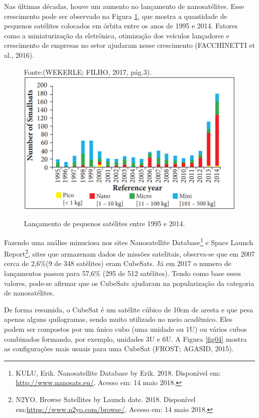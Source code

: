 Nas últimas décadas, houve um aumento no lançamento de nanosatélites. Esse crescimento pode ser observado na Figura \ref{fig03}, que mostra a quantidade de pequenos satélites colocados em órbita entre os anos de 1995 e 2014. Fatores como a miniaturização da eletrônica, otimização dos veículos lançadores e crescimento de empresas no setor ajudaram nesse crescimento (FACCHINETTI et al., 2016).

\begin{figure}[h]
	\centering
    Fonte:(WEKERLE; FILHO, 2017, pág.3).
	\includegraphics[keepaspectratio=true,scale=0.55]{figuras/lancamentoPequenoSatellite.PNG}
	\caption{Lançamento de pequenos satélites entre 1995 e 2014.}
	\label{fig03}
\end{figure}

Fazendo uma análise minuciosa nos sites Nanosatellite Database\footnote{ KULU, Erik. Nanosatellite Database by Erik. 2018. Disponível em: \url{http://www.nanosats.eu/}. Acesso em: 14 maio 2018.} e Space Launch Report\footnote{N2YO. Browse Satellites by Launch date. 2018. Disponível em:\url{https://www.n2yo.com/browse/}.  Acesso em: 14 maio 2018.}, sites que armazenam dados de missões satelitais, observa-se que em 2007 cerca de 2,6\%(9 de 348 satélites) eram CubeSats. Já em 2017 o numero de lançamentos passou para 57,6\% (295 de 512 satélites). Tendo como base esses valores, pode-se afirmar que os CubeSats ajudaram na popularização da categoria de nanosatélites.

De forma resumida, o CubeSat é um satélite cúbico de 10cm de aresta e que pesa apenas alguns quilogramas, sendo muito utilizado no meio acadêmico. Eles podem ser compostos por um único cubo (uma unidade ou 1U) ou vários cubos combinados formando, por exemplo, unidades 3U e 6U. A Figura \ref{fig04} mostra as configurações mais usuais para uma CubeSat (FROST; AGASID, 2015).


